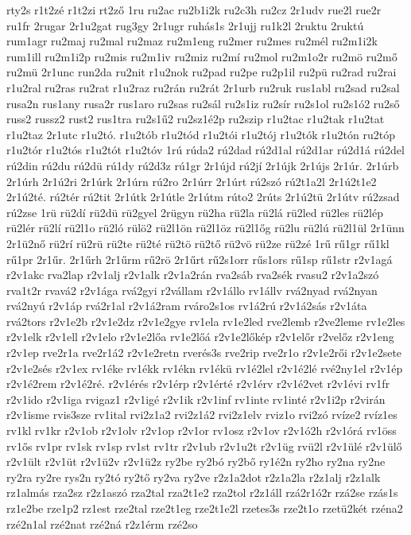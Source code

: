 {rty2s
r1t2zé
r1t2zi
rt2ző
1ru
ru2ac
ru2b1i2k
ru2c3h
ru2cz
2r1udv
rue2l
rue2r
ru1fr
2rugar
2r1u2gat
rug3gy
2r1ugr
ruhás1s
2r1ujj
ru1k2l
2ruktu
2ruktú
rum1agr
ru2maj
ru2mal
ru2maz
ru2m1eng
ru2mer
ru2mes
ru2mél
ru2m1i2k
rum1ill
ru2m1i2p
ru2mis
ru2m1iv
ru2miz
ru2mí
ru2mol
ru2m1o2r
ru2mö
ru2mő
ru2mü
2r1unc
run2da
ru2nit
r1u2nok
ru2pad
ru2pe
ru2p1il
ru2pü
ru2rad
ru2rai
r1u2ral
ru2ras
ru2rat
r1u2raz
ru2rán
ru2rát
2r1urb
ru2ruk
rus1abl
ru2sad
ru2sal
rusa2n
rus1any
rusa2r
rus1aro
ru2sas
ru2sál
ru2s1iz
ru2sír
ru2s1ol
ru2s1ó2
ru2ső
russ2
russz2
rust2
rus1tra
ru2s1ű2
ru2sz1é2p
ru2szip
r1u2tac
r1u2tak
r1u2tat
r1u2taz
2r1utc
r1u2tó.
r1u2tób
r1u2tód
r1u2tói
r1u2tój
r1u2tók
r1u2tón
ru2tóp
r1u2tór
r1u2tós
r1u2tót
r1u2tóv
1rú
rúda2
rú2dad
rú2d1al
rú2d1ar
rú2d1á
rú2del
rú2din
rú2du
rú2dü
rú1dy
rú2d3z
rú1gr
2r1újd
rú2jí
2r1újk
2r1újs
2r1úr.
2r1úrb
2r1úrh
2r1ú2ri
2r1úrk
2r1úrn
rú2ro
2r1úrr
2r1úrt
rú2szó
rú2t1a2l
2r1ú2t1e2
2r1ú2té.
rú2tér
rú2tit
2r1útk
2r1útle
2r1útm
rúto2
2rúts
2r1ú2tü
2r1útv
rú2zsad
rú2zse
1rü
rü2dí
rü2dü
rü2gyel
2rügyn
rü2ha
rü2la
rü2lá
rü2led
rü2les
rü2lép
rü2lér
rü2lí
rü2l1o
rü2ló
rülö2
rü2l1ön
rü2l1öz
rü2l1őg
rü2lu
rü2lú
rü2l1ül
2r1ünn
2r1ü2nő
rü2rí
rü2rü
rü2te
rü2té
rü2tö
rü2tő
rü2vö
rü2ze
rü2zé
1rű
rű1gr
rű1kl
rű1pr
2r1űr.
2r1űrh
2r1űrm
rű2rö
2r1űrt
rű2s1orr
rűs1ors
rű1sp
rű1str
r2v1agá
r2v1akc
rva2lap
r2v1alj
r2v1alk
r2v1a2rán
rva2sáb
rva2sék
rvasu2
r2v1a2szó
rva1t2r
rvavá2
r2v1ága
rvá2gyi
r2vállam
r2v1állo
rv1állv
rvá2nyad
rvá2nyan
rvá2nyú
r2v1áp
rvá2r1al
r2v1á2ram
rváro2s1os
rv1á2rú
r2v1á2sás
r2v1áta
rvá2tors
r2v1e2b
r2v1e2dz
r2v1e2gye
rv1ela
rv1e2led
rve2lemb
r2ve2leme
rv1e2les
r2v1elk
r2v1ell
r2v1elo
r2v1e2lőa
rv1e2lőá
r2v1e2lőkép
r2v1előr
r2velőz
r2v1eng
r2v1ep
rve2r1a
rve2r1á2
r2v1e2retn
rverés3s
rve2rip
rve2r1o
r2v1e2rői
r2v1e2sete
r2v1e2sés
r2v1ex
rv1éke
rv1ékk
rv1ékn
rv1ékü
rv1é2lel
r2v1é2lé
rvé2ny1el
r2v1ép
r2v1é2rem
r2v1é2ré.
r2v1érés
r2v1érp
r2v1érté
r2v1érv
r2v1é2vet
r2v1évi
rv1fr
r2v1ido
r2v1iga
rvigaz1
r2v1igé
r2v1ik
r2v1inf
rv1inte
rv1inté
r2v1i2p
r2virán
r2v1isme
rvis3sze
rv1ital
rvi2z1a2
rvi2z1á2
rvi2z1elv
rviz1o
rvi2zó
rvíze2
rvíz1es
rv1kl
rv1kr
r2v1ob
r2v1olv
r2v1op
r2v1or
rv1osz
r2v1ov
r2v1ó2h
r2v1órá
rv1öss
rv1ős
rv1pr
rv1sk
rv1sp
rv1st
rv1tr
r2v1ub
r2v1u2t
r2v1üg
rvü2l
r2v1ülé
r2v1ülő
r2v1ült
r2v1üt
r2v1ü2v
r2v1ü2z
ry2be
ry2bó
ry2bő
ry1é2n
ry2ho
ry2na
ry2ne
ry2ra
ry2re
rys2n
ry2tó
ry2tő
ry2va
ry2ve
r2z1a2dot
r2z1a2la
r2z1alj
r2z1alk
rz1almás
rza2sz
r2z1aszó
rza2tal
rza2t1e2
rza2tol
r2z1áll
rzá2r1ó2r
rzá2se
rzás1s
rz1e2be
rze1p2
rz1est
rze2tal
rze2t1eg
rze2t1e2l
rzetes3s
rze2t1o
rzetü2két
rzéna2
rzé2n1al
rzé2nat
rzé2ná
r2z1érm
rzé2so
}
